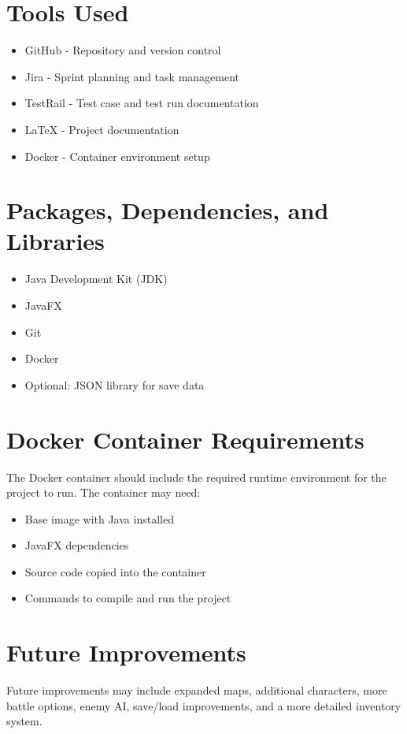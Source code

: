 \documentclass{article}
\begin{document}
\section{Tools Used}

\begin{itemize}
    \item GitHub - Repository and version control
    \item Jira - Sprint planning and task management
    \item TestRail - Test case and test run documentation
    \item LaTeX - Project documentation
    \item Docker - Container environment setup
\end{itemize}

\section{Packages, Dependencies, and Libraries}

\begin{itemize}
    \item Java Development Kit (JDK)
    \item JavaFX
    \item Git
    \item Docker
    \item Optional: JSON library for save data
\end{itemize}

\section{Docker Container Requirements}

The Docker container should include the required runtime environment for the project to run. The container may need:

\begin{itemize}
    \item Base image with Java installed
    \item JavaFX dependencies
    \item Source code copied into the container
    \item Commands to compile and run the project
\end{itemize}

\section{Future Improvements}

Future improvements may include expanded maps, additional characters, more battle options, enemy AI, save/load improvements, and a more detailed inventory system.
\end{document}
